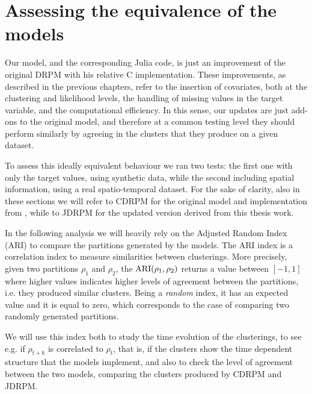 \documentclass[12pt,	%
	a4paper,		%
	twoside,		%
	openright,		%
	titlepage,%
	]{book}
\theoremstyle{definition}
\begin{document}

\section{Assessing the equivalence of the models}
Our model, and the corresponding Julia code, is just an improvement of the original DRPM with his relative C implementation. These improvements, as described in the previous chapters, refer to the insertion of covariates, both at the clustering and likelihood levels, the handling of missing values in the target variable, and the computational efficiency. In this sense, our updates are just add-ons to the original model, and therefore at a common testing level they should perform similarly by agreeing in the clusters that they produce on a given dataset.

To assess this ideally equivalent behaviour we ran two tests: the first one with only the target values, using synthetic data, while the second including spatial information, using a real spatio-temporal dataset. For the sake of clarity, also in these sections we will refer to CDRPM for the original model and implementation from \cite{1-drpm}, while to JDRPM for the updated version derived from this thesis work.

In the following analysis we will heavily rely on the Adjusted Random Index (ARI) \cite{ari-paper} to compare the partitions generated by the models. The ARI index is a correlation index to measure similarities between clusterings. More precisely, given two partitions $\rho_1$ and $\rho_2$, the $\operatorname{ARI}(\rho_1,\rho_2)$ returns a value between $[-1,1]$ where higher values indicates higher levels of agreement between the partitions, i.e. they produced similar clusters. Being a \textit{random} index, it has an expected value and it is equal to zero, which corresponds to the case of comparing two randomly generated partitions. 

We will use this index both to study the time evolution of the clusterings, to see e.g. if $\rho_{t+k}$ is correlated to $\rho_{t}$, that is, if the clusters show the time dependent structure that the models implement, and also to check the level of agreement between the two models, comparing the clusters produced by CDRPM and JDRPM.
\end{document}
